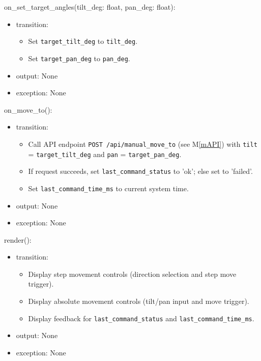 \documentclass[12pt, titlepage]{article}
\newcommand{\mref}[1]{M\ref{#1}}
\begin{document}
\noindent on\_set\_target\_angles(tilt\_deg: float, pan\_deg: float):
\begin{itemize}
  \item transition:
        \begin{itemize}
          \item Set \texttt{target\_tilt\_deg} to \texttt{tilt\_deg}.
          \item Set \texttt{target\_pan\_deg} to \texttt{pan\_deg}.
        \end{itemize}
  \item output: None
  \item exception: None
\end{itemize}

\noindent on\_move\_to():
\begin{itemize}
  \item transition:
        \begin{itemize}
          \item Call API endpoint \texttt{POST /api/manual\_move\_to} (see \mref{mAPI}) with
                \texttt{tilt} = \texttt{target\_tilt\_deg} and \texttt{pan} =
                \texttt{target\_pan\_deg}.
          \item If request succeeds, set \texttt{last\_command\_status} to 'ok'; else set to
                'failed'.
          \item Set \texttt{last\_command\_time\_ms} to current system time.
        \end{itemize}
  \item output: None
  \item exception: None
\end{itemize}

\noindent render():
\begin{itemize}
  \item transition:
        \begin{itemize}
          \item Display step movement controls (direction selection and step move trigger).
          \item Display absolute movement controls (tilt/pan input and move trigger).
          \item Display feedback for \texttt{last\_command\_status} and
                \texttt{last\_command\_time\_ms}.
        \end{itemize}
  \item output: None
  \item exception: None
\end{itemize}
\end{document}
